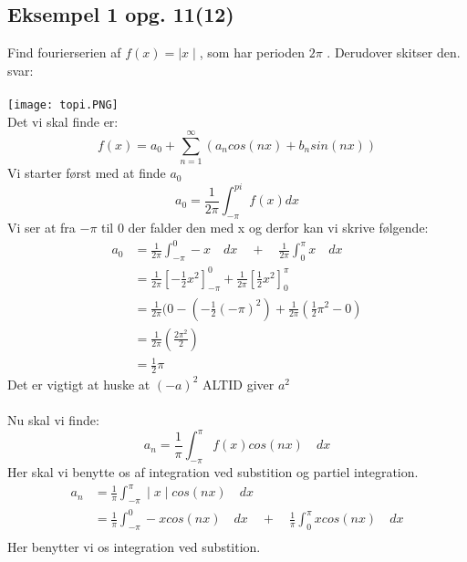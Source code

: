 \documentclass[11pt,fleqn]{book} %
\begin{document}
\subsection{Eksempel 1 opg. 11(12)}
Find fourierserien af $f(x)=\mid x \mid$, som har perioden $2 \pi$ . Derudover skitser den.\\
svar:\\\\
\texttt{[image: topi.PNG]}\\
Det vi skal finde er:
\begin{equation}
f(x)=a_0+\sum_{n=1}^{\infty} (a_n cos(nx)+b_n sin(nx))
\end{equation}
Vi starter først med at finde $a_0$
\begin{equation}
a_0=\frac{1}{2 \pi}\int_{-\pi}^{pi}f(x)dx
\end{equation}
Vi ser at fra $-\pi$ til 0 der falder den med x og derfor kan vi skrive følgende:
\begin{equation}
\begin{split}
a_0 &=\frac{1}{2 \pi}\int_{-\pi}^{0}-x\quad dx \quad +\quad \frac{1}{2 \pi}\int_{0}^{\pi}x\quad dx\\
&=\frac{1}{2 \pi}\left [-\frac{1}{2}x^2\right ]_{-\pi}^0+ \frac{1}{2 \pi}
\left [  \frac{1}{2}x^2\right ]_0^\pi \\
&=\frac{1}{2\pi}(0-(-\frac{1}{2}(-\pi)^2)+\frac{1}{2\pi}(\frac{1}{2}\pi^2-0)\\
&= \frac{1}{2\pi}(\frac{2\pi^2}{2})\\
&= \frac{1}{2}\pi
\end{split}
\end{equation}
Det er vigtigt at huske at $(-a)^2$ ALTID giver $a^2$\\\\
Nu skal vi finde:
\begin{equation}
a_n=\frac{1}{\pi}\int_{-\pi}^{\pi}f(x)cos(nx)\quad dx
\end{equation}
Her skal vi benytte os af integration ved substition og partiel integration.
\begin{equation}\label{jodis}
\begin{split}
a_n&=\frac{1}{\pi}\int_{-\pi}^{\pi} \mid x \mid cos(nx)\quad dx\\
&= \frac{1}{\pi}\int_{-\pi}^{0}-xcos(nx)\quad dx\quad+\quad\frac{1}{\pi}\int_{0}^{\pi}xcos(nx)\quad dx\\
\end{split}
\end{equation}
Her benytter vi os integration ved substition.
\end{document}
